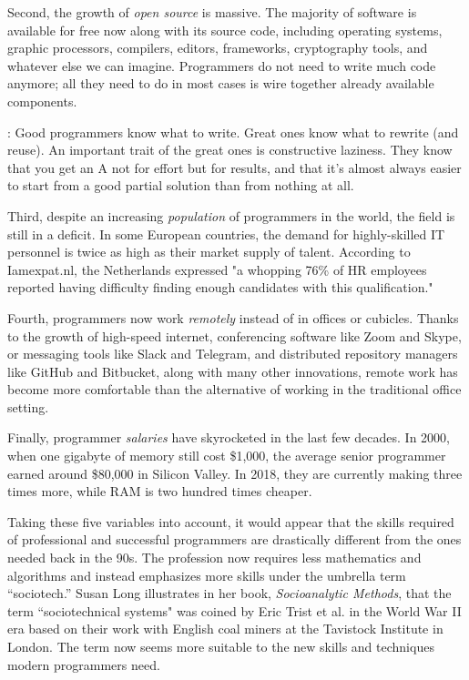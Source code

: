 \documentclass{main}
\begin{document}
Second, the growth of \emph{open source} is massive. The majority of software is available
for free now along with its source code, including operating systems,
graphic processors, compilers, editors, frameworks, cryptography
tools, and whatever else we can imagine. Programmers do not need to
write much code anymore; all they need to do in most cases is wire together
already available components.

\textcite{raymond1999}:
Good programmers know what to write. Great ones know what to rewrite (and reuse).
An important trait of the great ones is constructive laziness. They know that you get an A not for effort but for results, and that it's almost always easier to start from a good partial solution than from nothing at all.

Third, despite an increasing \emph{population} of programmers in the world, the field is still in
a deficit. In some European countries, the demand for highly-skilled
IT personnel is twice as high as their market supply of talent.
According to Iamexpat.nl,
the Netherlands expressed "a whopping 76\% of HR employees reported having difficulty
finding enough candidates with this qualification."

Fourth, programmers now work
\emph{remotely} instead of in offices or cubicles.
Thanks to the growth of high-speed internet,
conferencing software like Zoom and Skype, or
messaging tools like Slack
and
Telegram, and
distributed repository managers like
GitHub and Bitbucket,
along with many other innovations, remote work has become
more comfortable
than the alternative of working in the traditional office setting.

Finally, programmer \emph{salaries} have skyrocketed in the last few decades. In 2000, when one
gigabyte of memory still cost \$1,000, the average senior programmer
earned
around \$80,000 in Silicon Valley. In 2018, they are currently making
three times more,
while RAM is two hundred times cheaper.

Taking these five variables into account, it would appear that the skills required of
professional and successful programmers are drastically
different from the ones needed back in the 90s. The profession now requires less mathematics
and algorithms and instead emphasizes more skills under the umbrella term ``sociotech.''
Susan Long illustrates in her book, \emph{Socioanalytic Methods},
that the term ``sociotechnical systems"
was coined by Eric Trist et al. in the World War II era based on their work with
English coal miners at the Tavistock Institute in London. The term now seems more
suitable to the new skills and techniques modern programmers need.
\end{document}
